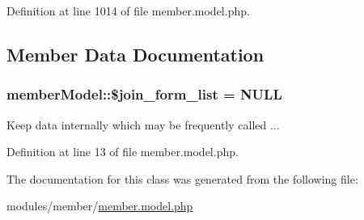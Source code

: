 Definition at line 1014 of file member.\+model.\+php.



\subsection{Member Data Documentation}
\hypertarget{classmemberModel_aa9b942e17ed74955c8700dd74d75d2b2}{}
\subsubsection[{\$join\+\_\+form\+\_\+list}]{\setlength{\rightskip}{0pt plus 5cm}member\+Model\+::\$join\+\_\+form\+\_\+list = N\+U\+L\+L}\label{classmemberModel_aa9b942e17ed74955c8700dd74d75d2b2}


Keep data internally which may be frequently called ... 



Definition at line 13 of file member.\+model.\+php.



The documentation for this class was generated from the following file\+:\begin{DoxyCompactItemize}
\item 
modules/member/\hyperlink{member_8model_8php}{member.\+model.\+php}\end{DoxyCompactItemize}
